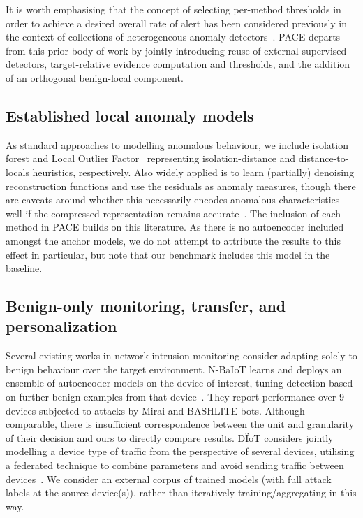 It is worth emphasising that the concept of selecting per-method thresholds in order to achieve a desired overall rate of alert has been considered previously in the context of collections of heterogeneous anomaly detectors~\cite{bridges2017threshold}. PACE departs from this prior body of work by jointly introducing reuse of external supervised detectors, target-relative evidence computation and thresholds, and the addition of an orthogonal benign-local component.

\subsection{Established local anomaly models} 
As standard approaches to modelling anomalous behaviour, we include isolation forest and Local Outlier Factor~\cite{liu2008isolation,breunig2000lof} representing isolation-distance and distance-to-locals heuristics, respectively. Also widely applied is to learn (partially) denoising reconstruction functions and use the residuals as anomaly measures, though there are caveats around whether this necessarily encodes anomalous characteristics well if the compressed representation remains accurate~\cite{pang2021review}. The inclusion of each method in PACE builds on this literature. As there is no autoencoder included amongst the anchor models, we do not attempt to attribute the results to this effect in particular, but note that our benchmark includes this model in the baseline.

\subsection{Benign-only monitoring, transfer, and personalization} 
Several existing works in network intrusion monitoring consider adapting solely to benign behaviour over the target environment. N-BaIoT learns and deploys an ensemble of autoencoder models on the device of interest, tuning detection based on further benign examples from that device~\cite{nbaiot2018}. They report performance over 9 devices subjected to attacks by Mirai and BASHLITE bots. Although comparable, there is insufficient correspondence between the unit and granularity of their decision and ours to directly compare results. D\"IoT considers jointly modelling a device type of traffic from the perspective of several devices, utilising a federated technique to combine parameters and avoid sending traffic between devices~\cite{diot2019}. We consider an external corpus of trained models (with full attack labels at the source device(s)), rather than iteratively training/aggregating in this way.

